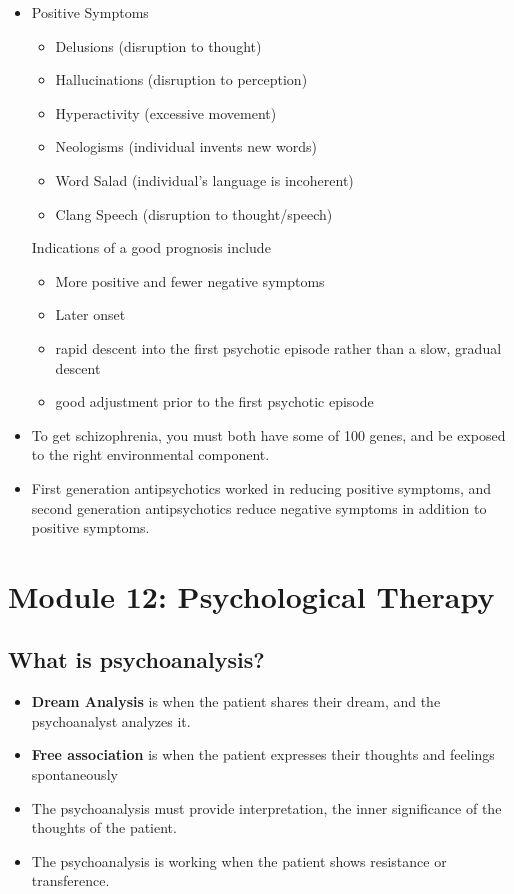 \documentclass[10pt,letter]{article}
\theoremstyle{plain}
\theoremstyle{definition}
\begin{document}
\begin{itemize}
\begin{itemize}
\begin{itemize}
        \end{itemize}
        \item Positive Symptoms \begin{itemize}
            \item Delusions (disruption to thought)
            \item Hallucinations (disruption to perception)
            \item Hyperactivity (excessive movement)
            \item Neologisms (individual invents new words)
            \item Word Salad (individual's language is incoherent)
            \item Clang Speech (disruption to thought/speech)
        \end{itemize} 
        Indications of a good prognosis include \begin{itemize}
            \item More positive and fewer negative symptoms 
            \item Later onset 
            \item rapid descent into the first psychotic episode rather than a slow, gradual descent 
            \item good adjustment prior to the first psychotic episode 
        \end{itemize}
        \item To get schizophrenia, you must both have some of 100 genes, and be exposed to the right environmental component. 
        \item First generation antipsychotics worked in reducing positive symptoms, and second generation antipsychotics reduce negative symptoms in addition to positive symptoms. 
    \end{itemize}
\end{itemize}

\section*{Module 12: Psychological Therapy}
\subsection*{What is psychoanalysis?}
\begin{itemize}
    \item \textbf{Dream Analysis} is when the patient shares their dream, and the psychoanalyst analyzes it. 
    \item \textbf{Free association} is when the patient expresses their thoughts and feelings spontaneously
    \item The psychoanalysis must provide interpretation, the inner significance of the thoughts of the patient. 
    \item The psychoanalysis is working when the patient shows resistance or transference. 
\end{itemize}
\end{document}
